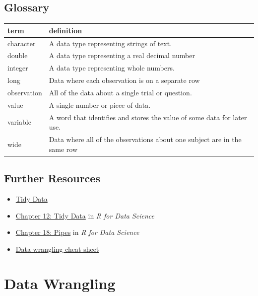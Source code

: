 \documentclass[
  oneside]{book}
\providecommand{\tightlist}{%
  \setlength{\itemsep}{0pt}\setlength{\parskip}{0pt}}
\begin{document}
\hypertarget{glossary-tidyr}{%
\section{Glossary}\label{glossary-tidyr}}

\begin{tabular}{l|l}
\hline
term & definition\\
\hline
character & A data type representing strings of text.\\
\hline
double & A data type representing a real decimal number\\
\hline
integer & A data type representing whole numbers.\\
\hline
long & Data where each observation is on a separate row\\
\hline
observation & All of the data about a single trial or question.\\
\hline
value & A single number or piece of data.\\
\hline
variable & A word that identifies and stores the value of some data for later use.\\
\hline
wide & Data where all of the observations about one subject are in the same row\\
\hline
\end{tabular}

\hypertarget{resources-tidyr}{%
\section{Further Resources}\label{resources-tidyr}}

\begin{itemize}
\tightlist
\item
  \href{http://vita.had.co.nz/papers/tidy-data.html}{Tidy Data}
\item
  \href{http://r4ds.had.co.nz/tidy-data.html}{Chapter 12: Tidy Data} in \emph{R for Data Science}
\item
  \href{http://r4ds.had.co.nz/pipes.html}{Chapter 18: Pipes} in \emph{R for Data Science}
\item
  \href{https://www.rstudio.com/wp-content/uploads/2015/02/data-wrangling-cheatsheet.pdf}{Data wrangling cheat sheet}
\end{itemize}

\hypertarget{dplyr}{%
\chapter{Data Wrangling}\label{dplyr}}
\end{document}
